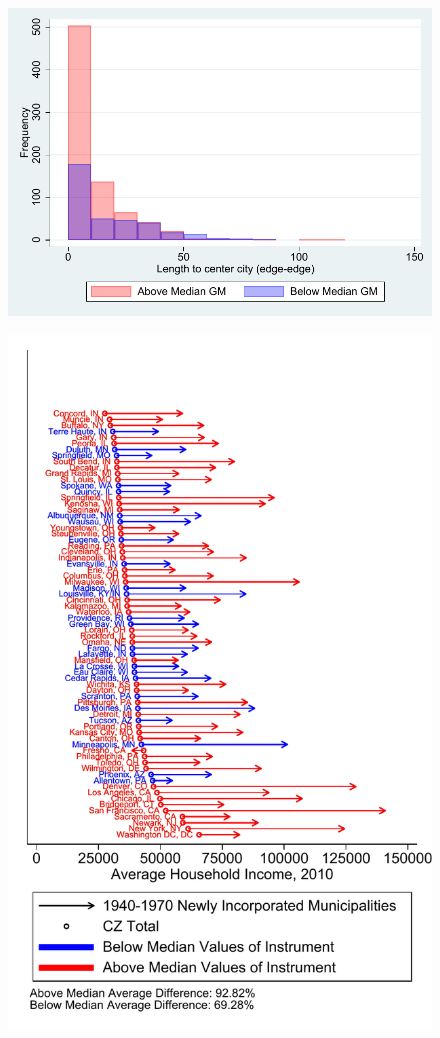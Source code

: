 \documentclass{article}
\begin{document}
\begin{landscape}
\clearpage

\clearpage
\begin{figure}
	\includegraphics{figures/implications/dist_edge_edge_4070.pdf}
\end{figure}
\clearpage
\begin{figure}
	\includegraphics{figures/pcarrow_figure_inc2010.pdf}

\end{figure}
\end{landscape}
\end{document}
